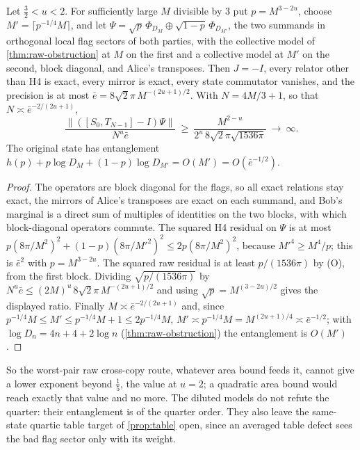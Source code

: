 \begin{proposition}\label{prop:window-dilution}
Let $\frac32<u<2$. For sufficiently large $M$ divisible by $3$ put $p=M^{3-2u}$, choose $M'=\lceil p^{-1/4}M\rceil$, and let $\Psi=\sqrt p\,\Phi_{D_M}\oplus
\sqrt{1-p}\,\Phi_{D_{M'}}$, the two summands in orthogonal local flag sectors of both parties, with the collective model of \cref{thm:raw-obstruction}
at $M$ on the first and a collective model at $M'$ on the second, block diagonal, and Alice's transposes. Then $J=-I$, every relator other
than H4 is exact, every mirror is exact, every state commutator vanishes, and the precision is at most $\bar e=8\sqrt2\pi\,M^{-(2u+1)/2}$.
With $N=4M/3+1$, so that $N\asymp\bar e^{-2/(2u+1)}$,
\[
\frac{\|([S_0,T_{N-1}]-I)\Psi\|}{N^u\bar e}\ \ge\ \frac{M^{2-u}}{2^u\,8\sqrt2\pi\sqrt{1536\pi}}\ \longrightarrow\ \infty .
\]
The original state has entanglement $h(p)+p\log D_M+(1-p)\log D_{M'}=O(M')=O(\bar e^{-1/2})$.
\end{proposition}

\begin{proof}
The operators are block diagonal for the flags, so all exact relations stay exact, the mirrors of Alice's transposes are exact on each
summand, and Bob's marginal is a direct sum of multiples of identities on the two blocks, with which block-diagonal operators commute. The
squared H4 residual on $\Psi$ is at most $p(8\pi/M^2)^2+(1-p)(8\pi/M'^2)^2\le2p(8\pi/M^2)^2$, because $M'^4\ge M^4/p$; this is $\bar e^2$ with
$p=M^{3-2u}$. The squared raw residual is at least $p/(1536\pi)$ by (O), from the first block. Dividing $\sqrt{p/(1536\pi)}$ by
$N^u\bar e\le(2M)^u\,8\sqrt2\pi\,M^{-(2u+1)/2}$ and using $\sqrt p=M^{(3-2u)/2}$ gives the displayed ratio. Finally $M\asymp\bar e^{-2/(2u+1)}$ and,
since $p^{-1/4}M\le M'\le p^{-1/4}M+1\le2p^{-1/4}M$, $M'\asymp p^{-1/4}M=M^{(2u+1)/4}\asymp\bar e^{-1/2}$; with $\log D_n=4n+4+2\log n$
(\cref{thm:raw-obstruction}) the entanglement is $O(M')$.
\end{proof}

So the worst-pair raw cross-copy route, whatever area bound feeds it, cannot give a lower exponent beyond $\frac15$, the value at $u=2$; a
quadratic area bound would reach exactly that value and no more. The diluted models do not refute the quarter: their entanglement is
of the quarter order. They also leave the same-state quartic table target of \cref{prop:table} open, since an averaged table defect sees
the bad flag sector only with its weight.




